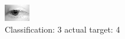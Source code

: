 \begin{figure}[h!]
\begin{center}
\includegraphics[width=0.60\columnwidth]{figures/ID2636_class_3_target_4.png}
\end{center}
\caption{ Classification: 3 actual target: 4}
\label{fig:ID2636_class_3_target_4}
\end{figure}
